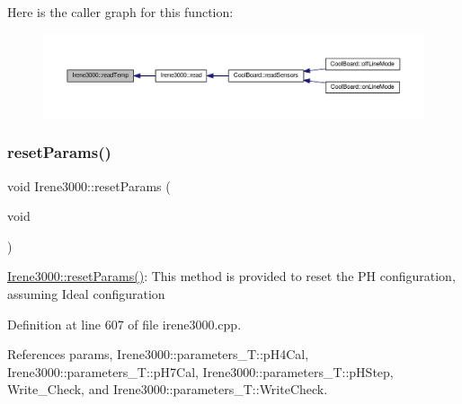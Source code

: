 Here is the caller graph for this function\+:
\nopagebreak
\begin{figure}[H]
\begin{center}
\leavevmode
\includegraphics[width=350pt]{classIrene3000_a94ad40f281d83ad1be20bf1edd6fe802_icgraph}
\end{center}
\end{figure}
\mbox{\label{classIrene3000_a0fba280e8b7c881307efa31281aa691d}} 
\subsubsection{\texorpdfstring{reset\+Params()}{resetParams()}}
{\footnotesize\ttfamily void Irene3000\+::reset\+Params (\begin{DoxyParamCaption}\item[{void}]{ }\end{DoxyParamCaption})}

\hyperlink{classIrene3000_a0fba280e8b7c881307efa31281aa691d}{Irene3000\+::reset\+Params()}\+: This method is provided to reset the PH configuration, assuming Ideal configuration 

Definition at line 607 of file irene3000.\+cpp.



References params, Irene3000\+::parameters\+\_\+\+T\+::p\+H4\+Cal, Irene3000\+::parameters\+\_\+\+T\+::p\+H7\+Cal, Irene3000\+::parameters\+\_\+\+T\+::p\+H\+Step, Write\+\_\+\+Check, and Irene3000\+::parameters\+\_\+\+T\+::\+Write\+Check.



